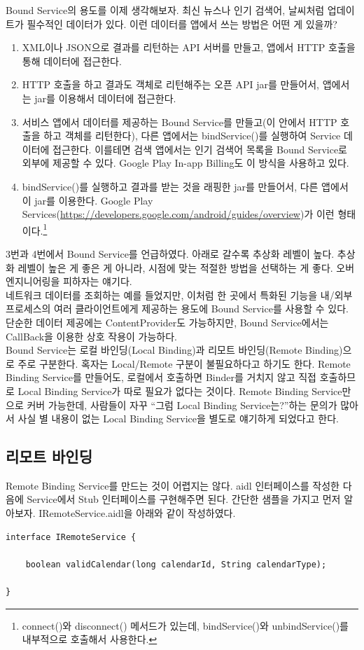 Bound Service의 용도를 이제 생각해보자.
최신 뉴스나 인기 검색어, 날씨처럼 업데이트가 필수적인 데이터가 있다. 이런 데이터를 앱에서 쓰는 방법은 어떤 게 있을까?
\begin{enumerate}
\item XML이나 JSON으로 결과를 리턴하는 API 서버를 만들고, 앱에서 HTTP 호출을 통해 데이터에 접근한다.
\item HTTP 호출을 하고 결과도 객체로 리턴해주는 오픈 API jar를 만들어서, 앱에서는 jar를 이용해서 데이터에 접근한다.
\item 서비스 앱에서 데이터를 제공하는 Bound Service를 만들고(이 안에서 HTTP 호출을 하고 객체를 리턴한다), 다른 앱에서는 bindService()를 실행하여 Service 데이터에 접근한다. 이를테면 검색 앱에서는 인기 검색어 목록을 Bound Service로 외부에 제공할 수 있다.
Google Play In-app Billing도 이 방식을 사용하고 있다.
\item bindService()를 실행하고 결과를 받는 것을 래핑한 jar를 만들어서, 다른 앱에서 이 jar를 이용한다. Google Play Services(\url{https://developers.google.com/android/guides/overview})가 이런 형태이다.\footnote{connect()와 disconnect() 메서드가 있는데, bindService()와 unbindService()를 내부적으로 호출해서 사용한다.}
\end{enumerate}
3번과 4번에서 Bound Service를 언급하였다. 
아래로 갈수록 추상화 레벨이 높다. 추상화 레벨이 높은 게 좋은 게 아니라, 시점에 맞는 적절한 방법을 선택하는 게 좋다. 오버엔지니어링을 피하자는 얘기다.\\

네트워크 데이터를 조회하는 예를 들었지만, 이처럼 한 곳에서 특화된 기능을 내/외부 프로세스의 여러 클라이언트에게 제공하는 용도에 Bound Service를 사용할 수 있다. 단순한 데이터 제공에는 ContentProvider도 가능하지만, Bound Service에서는 CallBack을 이용한 상호 작용이 가능하다.\\

Bound Service는 로컬 바인딩(Local Binding)과 리모트 바인딩(Remote Binding)으로 주로 구분한다.
혹자는 Local/Remote 구분이 불필요하다고 하기도 한다.
Remote Binding Service를 만들어도, 로컬에서 호출하면 Binder를 거치지 않고 직접 호출하므로 Local Binding Service가 따로 필요가 없다는 것이다. 
Remote Binding Service만으로 커버 가능한데, 사람들이 자꾸 ``그럼 Local Binding Service는?''하는 문의가 많아서 사실 별 내용이 없는 Local Binding Service을 별도로 얘기하게 되었다고 한다.\\

\subsection{리모트 바인딩}
Remote Binding Service를 만드는 것이 어렵지는 않다. 
aidl 인터페이스를 작성한 다음에 Service에서 Stub 인터페이스를 구현해주면 된다.
간단한 샘플을 가지고 먼저 알아보자. 
IRemoteService.aidl을 아래와 같이 작성하였다. 
\begin{lstlisting}[frame=single]
interface IRemoteService {

	boolean validCalendar(long calendarId, String calendarType);
		
}
\end{lstlisting}

